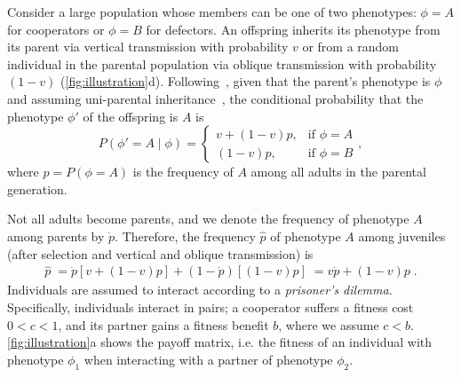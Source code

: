 \documentclass[12pt]{extarticle}
\begin{document}
Consider a large population whose members can be one of two phenotypes: $\phi=A$ for cooperators or $\phi=B$ for defectors.
An offspring inherits its phenotype from its parent via vertical transmission with probability $v$ or from a random individual in the parental population via oblique transmission with probability $(1-v)$ (\autoref{fig:illustration}d). 
Following~\citet{ram2018evolution}, given that the parent's phenotype is $\phi$ and assuming uni-parental inheritance~\citep{Zefferman2016}, the conditional probability that the phenotype $\phi'$ of the offspring is $A$ is 
\begin{equation} \label{eq:vertical_oblique_transmission}
P(\phi'=A \mid \phi) = \begin{cases}
v + (1-v)p, & \text{if } \phi=A \\
(1-v)p, & \text{if } \phi=B
\end{cases},
\end{equation}
where $p=P(\phi=A)$ is the frequency of $A$ among all adults in the parental generation.  

Not all adults become parents, and we denote the frequency of phenotype $A$ among parents by $\dot{p}$.
Therefore, the frequency $\hat{p}$ of  phenotype $A$ among juveniles (after selection and vertical and oblique transmission) is
\begin{equation}\label{eq:horizontal}
\begin{aligned}
\hat{p} \;=
\dot{p} [v + (1-v)p] + (1-\dot{p}) [(1-v)p] \;= 
v \dot{p} + (1-v) p \;.
\end{aligned}
\end{equation}
Individuals are assumed to interact according to a \emph{prisoner's dilemma}.
Specifically, individuals interact in pairs; a cooperator suffers a fitness cost $0<c<1$, and its partner gains a fitness benefit $b$, where we assume $c<b$. \autoref{fig:illustration}a shows the payoff matrix, i.e. the fitness of an individual with phenotype $\phi_1$ when interacting with a partner of phenotype $\phi_2$.
\end{document}
